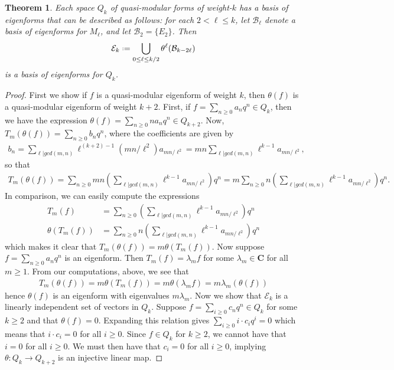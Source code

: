 \documentclass[12pt]{amsart}
\theoremstyle{plain}
\newtheorem{thm}{Theorem}[section]
\theoremstyle{definition}
\theoremstyle{remark}
\newcommand{\cB}{\mathcal{B}}
\newcommand{\cE}{\mathcal{E}}
\newcommand*{\df}{\mathrel{\vcenter{\baselineskip0.5ex \lineskiplimit0pt
                     \hbox{\scriptsize.}\hbox{\scriptsize.}}} =}
\newcommand{\CC}{\mathbf{C}}
\begin{document}
\begin{thm}
        \label{t:quasimodulareigenforms}
        Each space $Q_k$ of quasi-modular forms of weight-$k$ has a basis of eigenforms that can be described as follows: for each $2 < \ell \leq k$, let $\cB_{\ell}$ denote a basis of eigenforms for $M_\ell$, and let $\cB_2 = \{E_2\}$. Then
        \[
        \cE_k \df \bigcup_{0\leq \ell \leq k/2} \theta^{\ell} ( \cB_{k-2\ell} )
        \]
        is a basis of eigenforms for $Q_k$.
    \end{thm}
    \begin{proof}
        
        First we show if $f$ is a quasi-modular eigenform of weight $k$, then $\theta (f)$ is a quasi-modular eigenform of weight $k+2$. First, if $f=\sum_{n\geq 0}a_nq^n \in Q_{k}$, then we have the expression $\theta (f)=\sum_{n\geq 0}na_nq^n \in Q_{k+2}$. Now, $T_m(\theta (f))=\sum_{n\geq 0}b_nq^n$, where the coefficients are given by
        \begin{align*}
        b_n=\displaystyle\sum_{\ell|gcd(m,n)}\ell^{(k+2)-1}(mn/\ell^2)a_{mn/\ell^2}=mn\displaystyle\sum_{\ell|gcd(m,n)}\ell^{k-1}a_{mn/\ell^2},
        \end{align*}
        so that
        \begin{align*}
        T_m(\theta (f))=\displaystyle\sum_{n\geq 0}mn(\sum_{\ell|gcd(m,n)}\ell^{k-1}a_{mn/\ell^2})q^n=m\sum_{n\geq 0}n(\sum_{\ell|gcd(m,n)}\ell^{k-1}a_{mn/\ell^2})q^n.
        \end{align*}
        In comparison, we can easily compute the expressions
        \begin{align*}
        T_m(f)&=\displaystyle\sum_{n\geq 0}(\sum_{\ell|gcd(m,n)}\ell^{k-1}a_{mn/\ell^2})q^n \\
        \theta( T_m(f))&=\displaystyle\sum_{n\geq 0}n(\sum_{\ell|gcd(m,n)}\ell^{k-1}a_{mn/\ell^2})q^n
        \end{align*}
        which makes it clear that $T_m(\theta (f))=m\theta(T_m(f))$. Now suppose $f=\sum_{n\geq 0}a_nq^n$ is an eigenform. Then $T_{m}(f) = \lambda_{m}f$ for some $\lambda_{m} \in \CC$ for all $m \geq 1$. From our computations, above, we see that
        \begin{align*}
            T_m(\theta (f))=m\theta(T_m(f))=m\theta(\lambda_mf)=m\lambda_m(\theta (f))
        \end{align*}
        hence $\theta (f)$ is an eigenform with eigenvalues $m\lambda_m$. Now we show that $\cE_k$ is a linearly independent set of vectors in $Q_k$. Suppose $f = \sum_{i \geq 0} c_{n}q^{n} \in Q_{k}$ for some $k \geq 2$ and that $\theta (f) = 0$. Expanding this relation gives $\sum_{i \geq 0} i \cdot c_{i}q^{i} = 0$ which means that $i \cdot c_{i} = 0$ for all $i \geq 0$. Since $f \in Q_{k}$ for $k \geq 2$, we cannot have that $i=0$ for all $i \geq 0$. We must then have that $c_{i} = 0$ for all $i \geq 0$, implying $\theta : Q_{k} \to Q_{k+2}$ is an injective linear map.


\end{proof}
\end{document}
